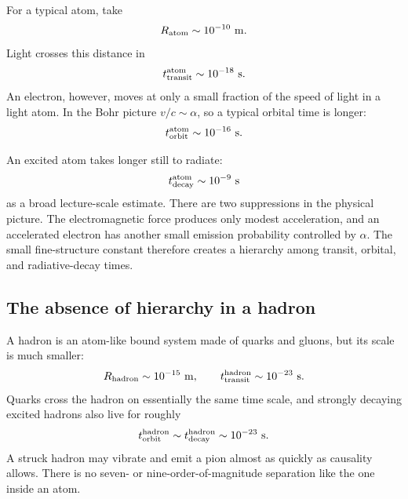For a typical atom, take
\begin{equation}
R_{\rm atom}\sim10^{-10}\ {\rm m}.
\end{equation}
Light crosses this distance in
\begin{equation}
t_{\rm transit}^{\rm atom}\sim10^{-18}\ {\rm s}.
\end{equation}
An electron, however, moves at only a small fraction of the speed of light in
a light atom. In the Bohr picture \(v/c\sim\alpha\), so a typical orbital time
is longer:
\begin{equation}
t_{\rm orbit}^{\rm atom}\sim10^{-16}\ {\rm s}.
\end{equation}

An excited atom takes longer still to radiate:
\begin{equation}
t_{\rm decay}^{\rm atom}\sim10^{-9}\ {\rm s}
\end{equation}
as a broad lecture-scale estimate. There are two suppressions in the physical
picture. The electromagnetic force produces only modest acceleration, and an
accelerated electron has another small emission probability controlled by
\(\alpha\). The small fine-structure constant therefore creates a hierarchy
among transit, orbital, and radiative-decay times.

\subsection{The absence of hierarchy in a hadron}

A hadron is an atom-like bound system made of quarks and gluons, but its scale
is much smaller:
\begin{equation}
R_{\rm hadron}\sim10^{-15}\ {\rm m},
\qquad
t_{\rm transit}^{\rm hadron}\sim10^{-23}\ {\rm s}.
\end{equation}
Quarks cross the hadron on essentially the same time scale, and strongly
decaying excited hadrons also live for roughly
\begin{equation}
t_{\rm orbit}^{\rm hadron}
\sim t_{\rm decay}^{\rm hadron}
\sim10^{-23}\ {\rm s}.
\end{equation}
A struck hadron may vibrate and emit a pion almost as quickly as causality
allows. There is no seven- or nine-order-of-magnitude separation like the one
inside an atom.

\begin{classroomqa}
\end{classroomqa}


